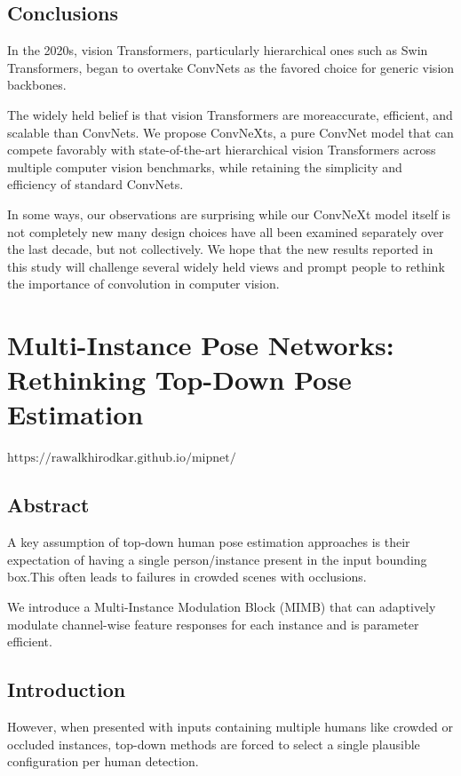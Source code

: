 \documentclass[11pt]{article}
\begin{document}
\subsection{Conclusions}
In the 2020s, vision Transformers, particularly hierarchical ones such as Swin Transformers, began to overtake ConvNets as the favored choice for generic vision backbones. 

The widely held belief is that vision Transformers are moreaccurate, efficient, and scalable than ConvNets. We propose ConvNeXts, a pure ConvNet model that can compete favorably with state-of-the-art hierarchical vision Transformers across multiple computer vision benchmarks, while retaining the simplicity and efficiency of standard ConvNets. 

In some ways, our observations are surprising while our ConvNeXt model itself is not completely new many design choices have all been examined separately over the last decade, but not collectively. We hope that the new results reported in this study will challenge several widely held views and prompt people to rethink the importance of convolution in computer vision.
\section{Multi-Instance Pose Networks: Rethinking Top-Down Pose Estimation}
$\text{https://rawalkhirodkar.github.io/mipnet/}$
\subsection{Abstract}
A key assumption of top-down human pose estimation approaches is their expectation of having a single person/instance present in the input bounding box.This often leads to failures in crowded scenes with occlusions.

We introduce a Multi-Instance Modulation Block (MIMB) that can adaptively modulate channel-wise feature responses for each instance and is parameter efficient.

\subsection{Introduction}
However, when presented with inputs containing multiple humans like crowded or occluded instances, top-down methods are forced to select a single plausible configuration per human detection.
\end{document}
